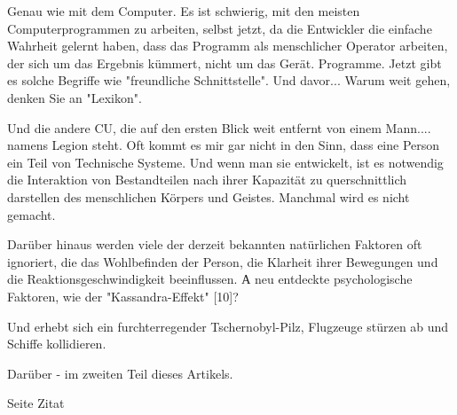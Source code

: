 \documentclass[11pt,a4paper]{article}
\begin{document}
Genau wie mit dem Computer. Es ist schwierig, mit den meisten Computerprogrammen zu arbeiten, selbst
jetzt, da die Entwickler die einfache Wahrheit gelernt haben, dass das Programm
als menschlicher Operator arbeiten, der sich um das Ergebnis kümmert, nicht um das Gerät.
Programme. Jetzt gibt es solche Begriffe wie "freundliche Schnittstelle".
Und davor... Warum weit gehen, denken Sie an "Lexikon".

Und die andere CU, die auf den ersten Blick weit entfernt von einem Mann.... namens Legion steht.
Oft kommt es mir gar nicht in den Sinn, dass eine Person ein Teil von
Technische Systeme. Und wenn man sie entwickelt, ist es notwendig
die Interaktion von Bestandteilen nach ihrer Kapazität zu querschnittlich darstellen
des menschlichen Körpers und Geistes. Manchmal wird es nicht gemacht.

Darüber hinaus werden viele der derzeit bekannten natürlichen Faktoren oft ignoriert,
die das Wohlbefinden der Person, die Klarheit ihrer Bewegungen und die Reaktionsgeschwindigkeit beeinflussen. А
neu entdeckte psychologische Faktoren, wie der "Kassandra-Effekt" [10]?

Und erhebt sich ein furchterregender Tschernobyl-Pilz, Flugzeuge stürzen ab und Schiffe kollidieren. 


Darüber - im zweiten Teil dieses Artikels.

\neue Seite
\und Zitat
\end{document}

